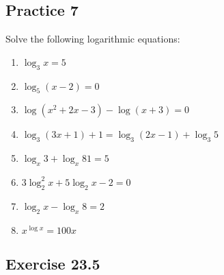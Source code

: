 \documentclass[12pt]{report}
\begin{document}
\subsection*{Practice 7}

\setlength{\columnseprule}{1pt}
\setlength{\columnsep}{24pt}
\begin{multicols}{2}

  Solve the following logarithmic equations:
  \begin{enumerate}
    \item $\log_3 x=5$
    \item $\log_{5}(x-2)=0$
    \item $\log(x^{2}+2x-3)-\log(x+3)=0$
    \item $\log_{3}(3x+1)+1=\log_{3}(2x-1)+\log_{3}5$
    \item $\log_{x}3+\log_{x}81=5$
    \item $3\log_{2}^{2}x+5\log_{2}x-2=0$
    \item $\log_{2}x-\log_{x}8=2$
    \item $x^{\log x}=100x$
  \end{enumerate}

\end{multicols}

\subsection{Exercise 23.5}
\end{document}

